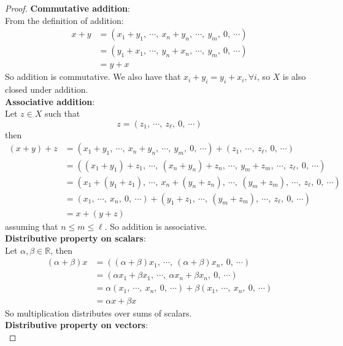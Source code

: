 \documentclass{article}
\newcommand{\parens}[1]{\left(#1\right)}
\newcommand{\R}{\mathbb{R}}
\begin{document}
\begin{proof}
    \textbf{Commutative addition}:\\
    From the definition of addition:
    \begin{align*}
    x + y &= \parens{x_1 + y_1,\ \cdots,\ x_n + y_n,\ 
    \cdots,\ y_m,\ 0,\ \cdots} \\
    &= \parens{y_1 + x_1,\ \cdots,\ y_n + x_n,\ 
    \cdots,\ y_m,\ 0,\ \cdots} \\
    &= y + x
    \end{align*}
    So addition is commutative. We also have that $x_i + y_i =
    y_i + x_i, \forall i$, so $X$ is also closed under addition.\\
    \textbf{Associative addition}:\\
    Let $z \in X$ such that
    $$z = \parens{z_1,\ \cdots,\ z_\ell,\ 0,\ \cdots}$$
    then
    \begin{align*}
    (x + y) + z &=  \parens{x_1 + y_1,\ \cdots,\ x_n + y_n,\ 
    \cdots,\ y_m,\ 0,\ \cdots} + \parens{z_1,\ \cdots,\ z_\ell,\ 
    0,\ \cdots}\\
    &= \parens{(x_1 + y_1) + z_1,\ \cdots,\ (x_n + y_n) + z_n,\ 
    \cdots,\ y_m + z_m,\ \cdots,\ z_\ell,\ 0,\ \cdots} \\
    &= \parens{x_1 + (y_1 + z_1),\ \cdots,\ x_n + (y_n + z_n),\ 
    \cdots,\ (y_m + z_m),\ \cdots,\ z_\ell,\ 0,\ \cdots} \\
    &= \parens{x_1,\ \cdots,\ x_n,\ 0,\ \cdots} + 
    \parens{y_1 + z_1,\ \cdots,\ (y_m + z_m),\ \cdots,\ z_\ell,\ 
    0,\ \cdots} \\
    &= x + (y+z)
    \end{align*}
    assuming that $n \leq m \leq \ell$. So addition is associative.\\
    \textbf{Distributive property on scalars}:\\
    Let $\alpha, \beta \in \R$, then
    \begin{align*}
    \parens{\alpha + \beta}x &= \parens{(\alpha + \beta)x_1,\ 
    \cdots,\ (\alpha + \beta)x_n,\ 0,\ \cdots} \\
    &= \parens{\alpha x_1 + \beta x_1,\ 
    \cdots,\ \alpha x_n + \beta x_n,\ 0,\ \cdots} \\
    &= \alpha\parens{x_1,\ \cdots,\ x_n,\ 0,\ \cdots} + 
    \beta\parens{x_1,\ \cdots,\ x_n,\ 0,\ \cdots} \\
    &= \alpha x + \beta x 
    \end{align*}
    So multiplication distributes over sums of scalars.\\
    \textbf{Distributive property on vectors}:\\

\end{proof}
\end{document}
